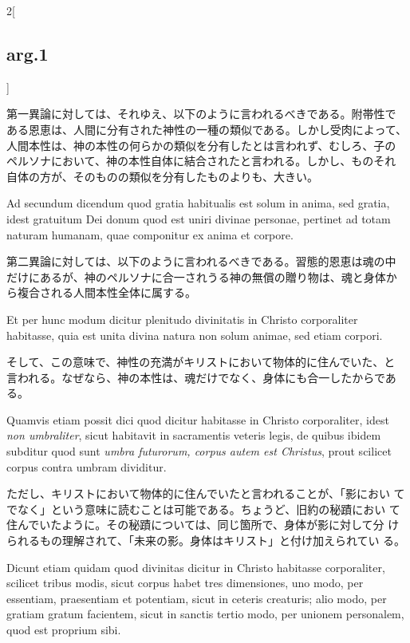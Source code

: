 \documentclass[paper=a4paper,fontsize=10pt,jafontsize=9pt,titlepage]{jlreq}
\begin{document}
\begin{paracol}{2}[\subsection{arg.1}]
\switchcolumn

第一異論に対しては、それゆえ、以下のように言われるべきである。附帯性で
ある恩恵は、人間に分有された神性の一種の類似である。しかし受肉によって、
人間本性は、神の本性の何らかの類似を分有したとは言われず、むしろ、子の
ペルソナにおいて、神の本性自体に結合されたと言われる。しかし、ものそれ
自体の方が、そのものの類似を分有したものよりも、大きい。

\switchcolumn*

Ad secundum dicendum quod gratia habitualis est solum in anima, sed
gratia, idest gratuitum Dei donum quod est uniri divinae personae,
pertinet ad totam naturam humanam, quae componitur ex anima et
corpore.

\switchcolumn

第二異論に対しては、以下のように言われるべきである。習態的恩恵は魂の中
だけにあるが、神のペルソナに合一されうる神の無償の贈り物は、魂と身体か
ら複合される人間本性全体に属する。

\switchcolumn*

Et per hunc modum dicitur plenitudo divinitatis in Christo
corporaliter habitasse, quia est unita divina natura non solum animae,
sed etiam corpori.

\switchcolumn

そして、この意味で、神性の充満がキリストにおいて物体的に住んでいた、と
言われる。なぜなら、神の本性は、魂だけでなく、身体にも合一したからであ
る。

\switchcolumn*

Quamvis etiam possit dici quod dicitur habitasse in Christo
corporaliter, idest {\itshape non umbraliter}, sicut habitavit in
sacramentis veteris legis, de quibus ibidem subditur quod sunt
{\itshape umbra futurorum, corpus autem est Christus}, prout scilicet
corpus contra umbram dividitur.

\switchcolumn

ただし、キリストにおいて物体的に住んでいたと言われることが、「影におい
てでなく」という意味に読むことは可能である。ちょうど、旧約の秘蹟におい
て住んでいたように。その秘蹟については、同じ箇所で、身体が影に対して分
けられるもの理解されて、「未来の影。身体はキリスト」と付け加えられてい
る。

\switchcolumn*

Dicunt etiam quidam quod divinitas dicitur in Christo habitasse
corporaliter, scilicet tribus modis, sicut corpus habet tres
dimensiones, uno modo, per essentiam, praesentiam et potentiam, sicut
in ceteris creaturis; alio modo, per gratiam gratum facientem, sicut
in sanctis tertio modo, per unionem personalem, quod est proprium
sibi.


\end{paracol}
\end{document}
